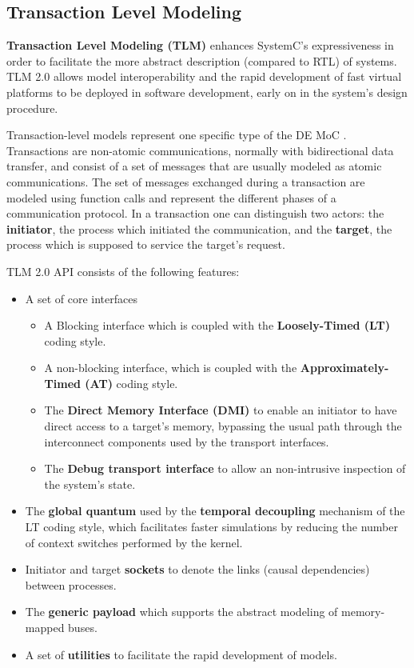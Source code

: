 \documentclass[12pt,twoside]{article}
\begin{document}
\subsection{Transaction Level Modeling}
\label{sec:orgheadline7}
\textbf{Transaction Level Modeling (TLM)} enhances SystemC's expressiveness in order to facilitate the more abstract description (compared to RTL) of systems.  
TLM 2.0 allows model interoperability and the rapid development of fast virtual platforms to be deployed in software development, early on in the system's design procedure.

Transaction-level models represent one specific type of the DE MoC \cite{Grotker2002}.
Transactions are non-atomic communications, normally with bidirectional data transfer, and consist of a set of messages that are usually modeled as atomic communications.
The set of messages exchanged during a transaction are modeled using function calls and represent the different phases of a communication protocol.
In a transaction one can distinguish two actors:
the \textbf{initiator}, the process which initiated the communication, and the \textbf{target}, the process which is supposed to service the target's request.

TLM 2.0 API \cite{OpenSystemCInitiative2009} consists of the following features:
\begin{itemize}
\item A set of core interfaces
\begin{itemize}
\item A Blocking interface which is coupled with the \textbf{Loosely-Timed (LT)} coding style.
\item A non-blocking interface, which is coupled with the \textbf{Approximately-Timed (AT)} coding style.
\item The \textbf{Direct Memory Interface (DMI)} to enable an initiator to have direct access to a target's memory, bypassing the usual path through the interconnect components used by the transport interfaces.
\item The \textbf{Debug transport interface} to allow an non-intrusive inspection of the system's state.
\end{itemize}
\item The \textbf{global quantum} used by the \textbf{temporal decoupling} mechanism of the LT coding style, which facilitates faster simulations by reducing the number of context switches performed by the kernel.
\item Initiator and target \textbf{sockets} to denote the links (causal dependencies) between processes.
\item The \textbf{generic payload} which supports the abstract modeling of memory-mapped buses.
\item A set of \textbf{utilities} to facilitate the rapid development of models.
\end{itemize}
\end{document}

